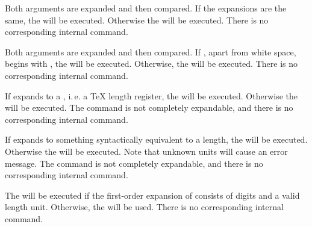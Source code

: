 \begin{Declaration}
\end{Declaration}
Both  arguments are expanded and then compared. If the
expansions are the same, the  will be executed. Otherwise the
 will be executed. There is no corresponding internal
command.
%
\EndIndexGroup


\begin{Declaration}
\end{Declaration}
Both  arguments are expanded
and then compared. If , apart from white space, begins with
, the  will be executed. Otherwise, the
 will be executed. There is no corresponding internal
command.%
\EndIndexGroup


\begin{Declaration}
\end{Declaration}
If  expands to a
, i.\,e. a \TeX{} length register, the  will be
executed. Otherwise the  will be executed. The command is not
completely expandable, and there is no corresponding internal command.%
\EndIndexGroup


\begin{Declaration}
\end{Declaration}
If  expands to something
syntactically equivalent to a length, the  will be executed.
Otherwise the  will be executed. Note
that unknown units will cause an error message. The command is not completely
expandable, and there is no corresponding internal command.%
\EndIndexGroup


\begin{Declaration}
\end{Declaration}
The  will be executed if the first-order expansion of
 consists of digits and a valid length unit. Otherwise, the
 will be used. There is no corresponding internal command.%
\EndIndexGroup


